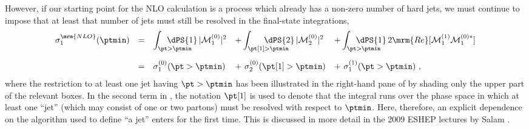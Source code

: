 However,  if our starting point for the NLO
calculation is a process which already has a non-zero number of hard
jets, we must 
continue to impose that at least that number of jets must still be resolved in the
final-state integrations,
\begin{equation}
\begin{array}{rclll}
\displaystyle\sigma^\mrm{NLO}_1(\ptmin) & = 
 & \displaystyle
   \int_{\pt>\ptmin}\hspace*{-11mm} \dPS{1}\, |{\cal M}^{(0)}_1|^2
 & \displaystyle 
   + \int_{\pt[1]>\ptmin}\hspace*{-11mm} \dPS{2}\,
   |{\cal M}^{(0)}_2|^2
 &\displaystyle 
   + \int_{\pt>\ptmin}\hspace*{-11mm} \dPS{1} \, 
   2\mrm{Re}[{\cal M}_{1}^{(1)} {\cal M}_1^{(0)*}] 
\\[6mm]
 & = &\displaystyle \sigma^{(0)}_1(\pt>\ptmin)
 & \displaystyle +\ \sigma^{(0)}_{2}(\pt[1]>\ptmin)
 & \displaystyle +\ \sigma^{(1)}_{1}(\pt>\ptmin)
~,\end{array}\label{eq:sigmanlo1}
\end{equation}
where the restriction to at least one jet having 
$\pt>\ptmin$ has been illustrated in the right-hand 
pane of  by shading only the upper part of the
relevant boxes. In the second term in , 
the notation $\pt[1]$ is used to
denote that the integral runs over the phase space in which at least
one ``jet'' (which may consist of one or two partons) must be resolved
with respect to $\ptmin$. Here, therefore, an explicit dependence on
the algorithm used to define ``a jet'' enters for the first time. This
is discussed in more detail in the 2009 ESHEP lectures by Salam
\cite{Salam:2010zt}. 
%

